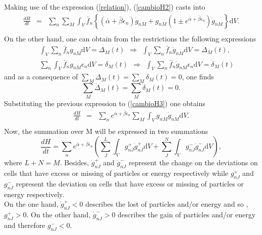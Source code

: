 \documentclass{article}
\begin{document}
Making use of the expression (\ref{relation}),
(\ref{cambioH2}) casts into
\begin{eqnarray}
    \frac{dH}{dt}&=&\sum_n \sum_M \int_V\bar{f}_n\left \{ (\bar{\alpha}+\bar{\beta}{\epsilon}_n)\dot{g}_{nM}+ g_{nM}\left(1\pm e^{\bar{\alpha}+\bar{\beta}{\epsilon}_n}\right)\dot{g}_{nM} \right \}\mathrm{d}V. \nonumber \\
    \label{cambioH3}
\end{eqnarray}{}
On the other hand, one can obtain from the restrictions the following expressions
\begin{eqnarray}
    &&\int_V\sum_n \bar{f}_n g_{nM}\mathrm{d}V=\Delta_M(t) \ \  \Rightarrow \ \ \int_V \sum_n \bar{f}_n \dot{g}_{nM}\mathrm{d}V=\dot{\Delta}_M(t), \nonumber \\
    &&\sum_n \int_V \bar{f}_n g_{nM}\epsilon_n\mathrm{d}V=\delta_M(t) \ \  \Rightarrow \ \ \int_V \sum_n \bar{f}_n \dot{g}_{nM}\epsilon_n\mathrm{d}V=\dot{\delta}_M(t)
\end{eqnarray}{}
and as a consequence of $\sum_M \Delta_M(t)=\sum_M \delta_M(t)=0$, one finds
\begin{equation}
    \sum_M \dot{\Delta}_M(t)=\sum_M \dot{\delta}_{M}(t)=0.
\end{equation}{}
Substituting the previous expression to (\ref{cambioH3}) one obtains
\begin{eqnarray}
   \frac{dH}{dt}&=&  \sum_n e^{\bar{\alpha}+\bar{\beta}\epsilon_n}\sum_M \int_V g_{nM}\dot{g}_{nM}\mathrm{d}V. \nonumber \\ \label{cambioH4}
\end{eqnarray}{}
Now, the summation over M will be expressed in two summations
\begin{equation}
    \frac{dH}{dt}=\sum_n  e^{\bar{\alpha}+\bar{\beta}\epsilon_n}\left(\sum_J ^{L}\int_V g^{+}_{nJ}\dot{g}^{+}_{nJ}\mathrm{d}V+\sum^{N}_J \int_V g^{-}_{nJ}\dot{g}^{-}_{nJ}\mathrm{d}V \right), \label{cambioH5}
\end{equation}{}
where $L+N=M$. Besides, $\dot{g}^{+}_{nJ}$ and $\dot{g}^{-}_{nJ}$  represent the change on the deviations on cells that have excess or missing of particles or energy respectively while $g^{+}_{nJ}$ and $g^{-}_{nJ}$ represent the deviation on cells that have excess or missing of particles or energy respectively.\\
On the one hand, $\dot{g}^{+}_{nJ}<0$ describes the lost of particles and/or energy and so , $g^{+}_{nJ}>0$. On the other hand, $\dot{g}^{-}_{nJ}>0$ describes the gain of particles and/or energy and therefore $g^{-}_{nJ}<0$. \\
\end{document}
